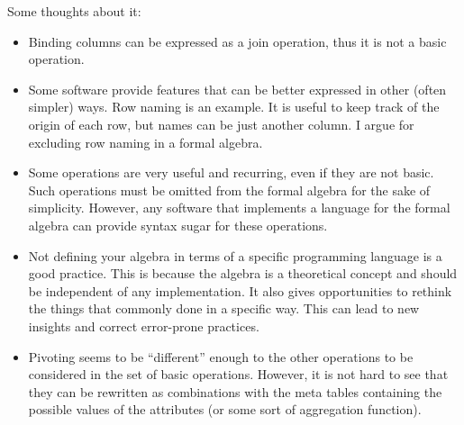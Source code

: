 Some thoughts about it:
\begin{itemize}
  \item Binding columns can be expressed as a join operation, thus it is not a basic
    operation.
  \item Some software provide features that can be better expressed in other (often simpler) ways.  Row
    naming is an example.  It is useful to keep track of the origin of each row, but names
    can be just another column.  I argue for excluding row naming in a formal algebra.
  \item Some operations are very useful and recurring, even if they are not basic.  Such
    operations must be omitted from the formal algebra for the sake of simplicity.
    However, any software that implements a language for the formal algebra can provide
    syntax sugar for these operations.
  \item Not defining your algebra in terms of a specific programming language is a good
    practice.  This is because the algebra is a theoretical concept and should be
    independent of any implementation.  It also gives opportunities to rethink the
    things that commonly done in a specific way.  This can lead to new insights and
    correct error-prone practices.
  \item Pivoting seems to be ``different'' enough to the other operations to be considered
    in the set of basic operations.  However, it is not hard to see that they can be
    rewritten as combinations with the meta tables containing the possible values of the
    attributes (or some sort of aggregation function).
\end{itemize}

